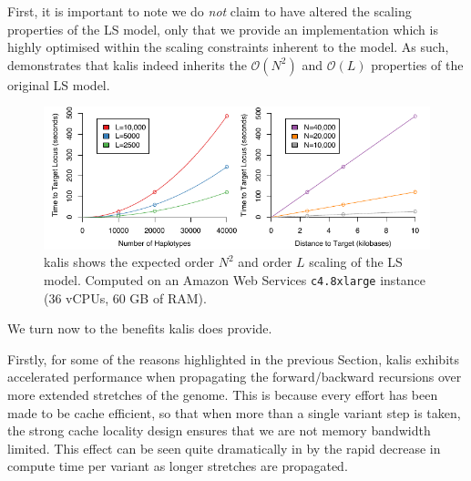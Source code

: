 \documentclass[pdflatex,referee,lineno,sn-nature]{sn-jnl}%
\newcommand{\pkg}[1]{{\fontseries{m}\fontseries{b}\selectfont #1}}
\begin{document}
First, it is important to note we do \emph{not} claim to have altered the scaling properties of the LS model, only that we provide an implementation which is highly optimised within the scaling constraints inherent to the model.
As such,  demonstrates that \pkg{kalis} indeed inherits the \(\mathcal{O}(N^2)\) and \(\mathcal{O}(L)\) properties of the original LS model.

\begin{figure}
  \centering
  \includegraphics{fig2}
	\caption{
	  \pkg{kalis} shows the expected order $N^2$ and order $L$ scaling of the LS model.
	  Computed on an Amazon Web Services \texttt{c4.8xlarge} instance (36 vCPUs, 60 GB of RAM).
	}
	\label{fig:perfscaling}
\end{figure}

We turn now to the benefits \pkg{kalis} does provide.

Firstly, for some of the reasons highlighted in the previous Section, \pkg{kalis} exhibits accelerated performance when propagating the forward/backward recursions over more extended stretches of the genome.
This is because every effort has been made to be cache efficient, so that when more than a single variant step is taken, the strong cache locality design ensures that we are not memory bandwidth limited.
This effect can be seen quite dramatically in  by the rapid decrease in compute time per variant as longer stretches are propagated.
\end{document}
